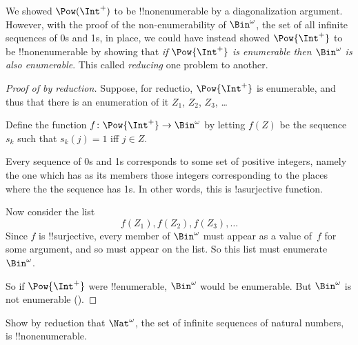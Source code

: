 \documentclass[../../include/open-logic-section]{subfiles}
\begin{document}


We showed $\Pow(\Int^+)$ to be !!{nonenumerable} by a diagonalization
argument. However, with the proof of the non-enumerability of
$\Bin^\omega$, the set of all infinite sequences of 0s and 1s, in
place, we could have instead showed $\Pow{\Int^+}$ to be
!!{nonenumerable} by showing that \emph{if $\Pow{\Int^+}$ is
  enumerable then $\Bin^\omega$ is also enumerable}. This called
\emph{reducing} one problem to another.

\begin{proof}[Proof of {} by reduction]
Suppose, for reductio, $\Pow{\Int^+}$ is enumerable, and thus that
there is an enumeration of it $Z_{1}$, $Z_{2}$, $Z_{3}$, \dots

Define the function $f \colon \Pow{\Int^+} \to \Bin^\omega$ by letting
$f(Z)$ be the sequence $s_{k}$ such that $s_{k}(j) = 1$ iff $j \in Z$.

Every sequence of 0s and 1s corresponds to some set of positive
integers, namely the one which has as its members those integers
corresponding to the places where the the sequence has 1s. In other
words, this is !a{surjective} function.

Now consider the list 
\[
f(Z_1), f(Z_2), f(Z_3), \dots
\]
Since $f$ is !!{surjective}, every member of $\Bin^\omega$ must
appear as a value of~$f$ for some argument, and so must appear on the
list. So this list must enumerate~$\Bin^\omega$.

So if $\Pow{\Int^+}$ were !!{enumerable}, $\Bin^\omega$ would be enumerable.
But $\Bin^\omega$ is not enumerable ().
\end{proof}

\begin{prob}
Show by reduction that $\Nat^\omega$, the set of infinite sequences of
natural numbers, is !!{nonenumerable}.
\end{prob}
\end{document}
